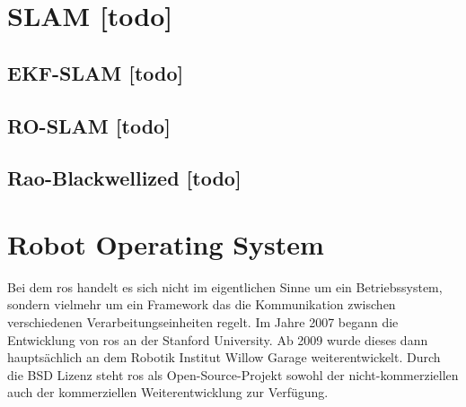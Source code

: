 \section{SLAM [todo]}



%
%
%
\subsection{EKF-SLAM [todo]}


%
%
%
\subsection{RO-SLAM [todo]}


%
%
\subsection{Rao-Blackwellized [todo]}


%
%
\section{Robot Operating System}

Bei dem \Gls{ros} handelt es sich nicht im eigentlichen Sinne um ein Betriebssystem, sondern vielmehr um ein Framework das die Kommunikation zwischen verschiedenen Verarbeitungseinheiten regelt. Im Jahre 2007 begann die Entwicklung von \Gls{ros} an der Stanford University. Ab 2009 wurde dieses dann hauptsächlich an dem Robotik Institut Willow Garage weiterentwickelt. Durch die BSD Lizenz steht \Gls{ros} als Open-Source-Projekt sowohl der nicht-kommerziellen auch der kommerziellen Weiterentwicklung zur Verfügung. \cite{quigley2009ros}


